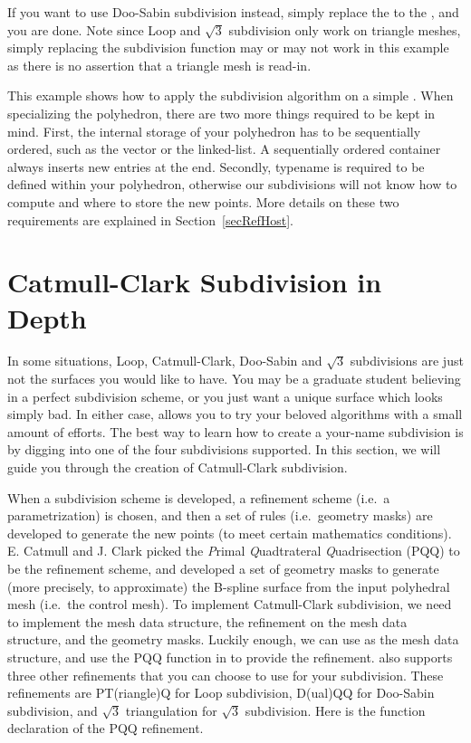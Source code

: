 If you want to use Doo-Sabin subdivision instead, simply replace the 
 to the , 
and you are done. Note since Loop and $\sqrt{3}$ subdivision only work on 
triangle meshes, simply replacing the subdivision function may or 
may not work in this example as there is no assertion that a triangle 
mesh is read-in.

This example shows how to apply the subdivision algorithm 
on a simple . When specializing the polyhedron,
there are two more things required to be kept in mind.  
First, the internal storage of your 
polyhedron has to be sequentially ordered, such as the vector 
or the linked-list. A sequentially ordered container always inserts new 
entries at the end. Secondly, typename  is 
required to be defined within your polyhedron, otherwise our
subdivisions will not know how to compute and where to store the
new points. More details on these two requirements are explained
in Section~\ref{secRefHost}.

\section{Catmull-Clark Subdivision in Depth}
\label{secCC}
In some situations, Loop, Catmull-Clark, Doo-Sabin and $\sqrt{3}$ 
subdivisions are just not the surfaces you would like to have. You 
may be a graduate student believing in a perfect subdivision scheme, or
you just want a unique surface which looks simply bad. In either case,
 allows you to try your beloved algorithms
with a small amount of efforts. The best way to learn how to create
a your-name subdivision is by digging into one of the four subdivisions
 supported. In this section, we will guide 
you through the creation of Catmull-Clark subdivision.

When a subdivision scheme is developed, a refinement scheme (i.e.~a 
parametrization) is chosen, and then a set of rules (i.e.~geometry 
masks) are developed to generate the new points (to meet certain 
mathematics conditions). E. Catmull and J. Clark picked the \emph{P}rimal 
\emph{Q}uadtrateral \emph{Q}uadrisection (PQQ) to be the refinement scheme,
and developed a set of geometry masks to generate (more precisely, to 
approximate) the B-spline surface from the input polyhedral mesh (i.e.~the 
control mesh). To implement Catmull-Clark subdivision, we need to 
implement the mesh data structure, the refinement on the mesh data 
structure, and the geometry masks. Luckily enough, we can use 
 as the mesh data structure, and use the 
PQQ function in  to provide the refinement. 
 also supports three other refinements that 
you can choose to use for your subdivision. These refinements are
PT(riangle)Q for Loop subdivision, D(ual)QQ for Doo-Sabin subdivision, 
and $\sqrt{3}$ triangulation for $\sqrt{3}$ 
subdivision. Here is the function declaration of the PQQ refinement.

